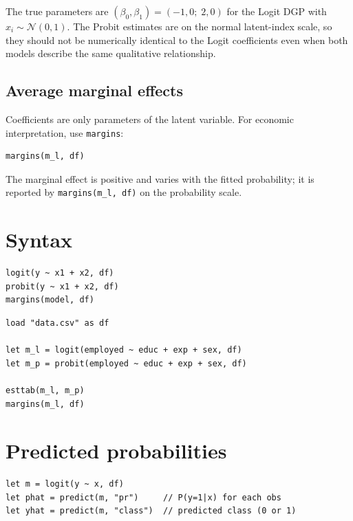 The true parameters are $(\beta_0, \beta_1) = (-1{,}0;\; 2{,}0)$ for
the Logit DGP with $x_i \sim \mathcal{N}(0,1)$. The Probit estimates are on
the normal latent-index scale, so they should not be numerically identical to
the Logit coefficients even when both models describe the same qualitative
relationship.

\subsection*{Average marginal effects}

Coefficients are only parameters of the latent variable. For
economic interpretation, use \lstinline{margins}:

\begin{lstlisting}[caption={Logit AME}]
margins(m_l, df)
\end{lstlisting}

The marginal effect is positive and varies with the fitted probability; it is
reported by \lstinline{margins(m_l, df)} on the probability scale.

\section{Syntax}

\begin{lstlisting}
logit(y ~ x1 + x2, df)
probit(y ~ x1 + x2, df)
margins(model, df)
\end{lstlisting}

\begin{lstlisting}[caption={Typical workflow --- discrete choice}]
load "data.csv" as df

let m_l = logit(employed ~ educ + exp + sex, df)
let m_p = probit(employed ~ educ + exp + sex, df)

esttab(m_l, m_p)
margins(m_l, df)
\end{lstlisting}

\section{Predicted probabilities}

\begin{lstlisting}
let m = logit(y ~ x, df)
let phat = predict(m, "pr")     // P(y=1|x) for each obs
let yhat = predict(m, "class")  // predicted class (0 or 1)
\end{lstlisting}

